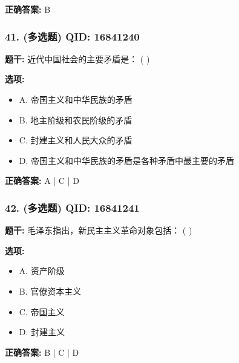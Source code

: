 \documentclass[12pt,UTF8]{ctexart}
\begin{document}
\textbf{正确答案:}
B

\vspace{0.3em}\hrulefill\vspace{0.7em}

\subsubsection*{41. (多选题) \small QID: 16841240}

\textbf{题干:}
近代中国社会的主要矛盾是： ( )

\textbf{选项:}
\begin{itemize}[leftmargin=*]

  \item A. 帝国主义和中华民族的矛盾

  \item B. 地主阶级和农民阶级的矛盾

  \item C. 封建主义和人民大众的矛盾

  \item D. 帝国主义和中华民族的矛盾是各种矛盾中最主要的矛盾

\end{itemize}

\textbf{正确答案:}
A | C | D

\vspace{0.3em}\hrulefill\vspace{0.7em}

\subsubsection*{42. (多选题) \small QID: 16841241}

\textbf{题干:}
毛泽东指出，新民主主义革命对象包括： ( )

\textbf{选项:}
\begin{itemize}[leftmargin=*]

  \item A. 资产阶级

  \item B. 官僚资本主义

  \item C. 帝国主义

  \item D. 封建主义

\end{itemize}

\textbf{正确答案:}
B | C | D

\vspace{0.3em}\hrulefill\vspace{0.7em}
\end{document}
